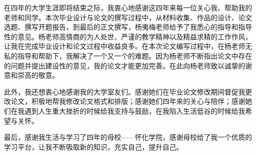 
\begin{acknowledgement}
在四年的大学生涯即将结束之际，我衷心地感谢这四年来每一位关心我、帮助我的老师和同学。本次毕业设计与论文的撰写过程中，从材料收集、作品的设计、论文选题、撰写开题报告，到最后的正文撰写，杨夷梅老师给予了我悉心的指导和指导性的意见。杨老师高情商的为人处世、严谨的教学精神以及精益求精的工作作风，让我在完成毕业设计和论文过程中收益良多。在本次论文编写过程中，在杨老师无私的指导和帮助下，我解决了一个又一个的难题。因为杨老师不断指出论文中存在的问题并提出建设性的意见，我的论文才能更加完善。在此向杨老师致以诚挚的谢意和崇高的敬意。

此外，我还想衷心地感谢我的大学室友们。感谢她们在毕业论文修改期间督促我更改论文，积极地帮我修改论文格式和排版；感谢她们四年来的关心与陪伴；感谢她们在我遇到人生重大挫折的时候给我支持与鼓励，在我陷入生活低谷的时候给我希望与关怀。

最后，感谢我生活与学习了四年的母校——怀化学院，感谢母校给了我一个优质的学习平台，让我不断吸取新的知识，充实自己，提升自己。
\end{acknowledgement}
